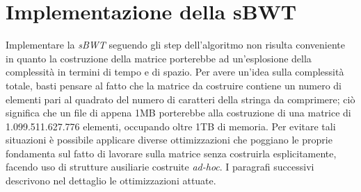\section{Implementazione della sBWT} 
Implementare la \emph{sBWT} seguendo gli step dell'algoritmo non risulta conveniente in quanto la costruzione della matrice porterebbe ad un'esplosione della complessità in termini di tempo e di spazio. Per avere un'idea sulla complessità totale, basti pensare al fatto che la matrice da costruire contiene un numero di elementi pari al quadrato del numero di caratteri della stringa da comprimere; ciò significa che un file di appena 1MB porterebbe alla costruzione di una matrice di 1.099.511.627.776 elementi, occupando oltre 1TB di memoria. Per evitare tali situazioni è possibile applicare diverse ottimizzazioni che poggiano le proprie fondamenta sul fatto di lavorare sulla matrice senza costruirla esplicitamente, facendo uso di strutture ausiliarie costruite \emph{ad-hoc}. I paragrafi successivi descrivono nel dettaglio le ottimizzazioni attuate.
